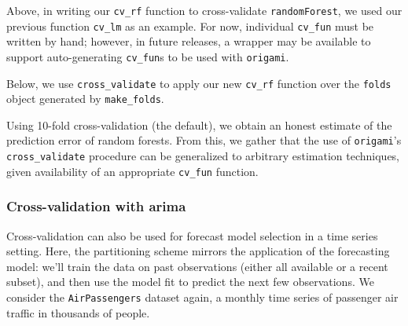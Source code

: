 \documentclass[12pt, krantz2,]{krantz}
\newenvironment{Shaded}{\begin{snugshade}}{\end{snugshade}}
\newcommand{\CommentTok}[1]{\textcolor[rgb]{0.37,0.37,0.37}{\textit{#1}}}
\newcommand{\DataTypeTok}[1]{\textcolor[rgb]{0.27,0.27,0.27}{#1}}
\newcommand{\DecValTok}[1]{\textcolor[rgb]{0.06,0.06,0.06}{#1}}
\newcommand{\FloatTok}[1]{\textcolor[rgb]{0.06,0.06,0.06}{#1}}
\newcommand{\KeywordTok}[1]{\textcolor[rgb]{0.27,0.27,0.27}{\textbf{#1}}}
\newcommand{\NormalTok}[1]{#1}
\newcommand{\OperatorTok}[1]{\textcolor[rgb]{0.43,0.43,0.43}{\textbf{#1}}}
\newcommand{\OtherTok}[1]{\textcolor[rgb]{0.37,0.37,0.37}{#1}}
\newcommand{\StringTok}[1]{\textcolor[rgb]{0.5,0.5,0.5}{#1}}
\theoremstyle{definition}
\theoremstyle{definition}
\theoremstyle{definition}
\newcommand{\1}{\mathbbm{1}}
\begin{document}
Above, in writing our \texttt{cv\_rf} function to cross-validate \texttt{randomForest}, we used
our previous function \texttt{cv\_lm} as an example. For now, individual \texttt{cv\_fun} must
be written by hand; however, in future releases, a wrapper may be available to
support auto-generating \texttt{cv\_fun}s to be used with \texttt{origami}.

Below, we use \texttt{cross\_validate} to apply our new \texttt{cv\_rf} function over the \texttt{folds}
object generated by \texttt{make\_folds}.

\begin{Shaded}
\end{Shaded}

Using 10-fold cross-validation (the default), we obtain an honest estimate of
the prediction error of random forests. From this, we gather that the use of
\texttt{origami}'s \texttt{cross\_validate} procedure can be generalized to arbitrary estimation
techniques, given availability of an appropriate \texttt{cv\_fun} function.

\hypertarget{cross-validation-with-arima}{%
\subsubsection{Cross-validation with arima}\label{cross-validation-with-arima}}

Cross-validation can also be used for forecast model selection in a time series
setting. Here, the partitioning scheme mirrors the application of the
forecasting model: we'll train the data on past observations (either all
available or a recent subset), and then use the model fit to predict the next
few observations. We consider the \texttt{AirPassengers} dataset again, a monthly time
series of passenger air traffic in thousands of people.
\end{document}
